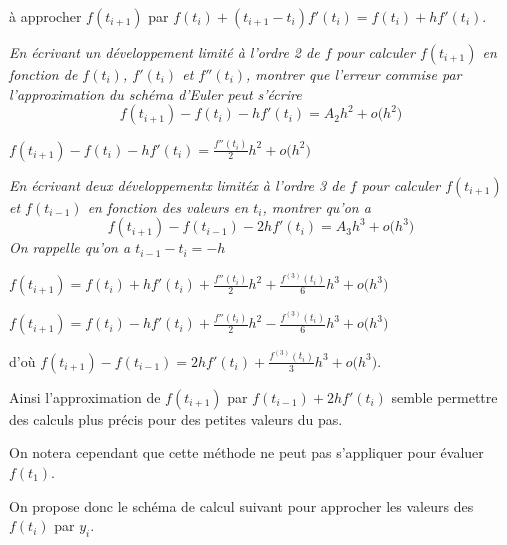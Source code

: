  à approcher $f(t_{i+1})$ par $f(t_i) + (t_{i+1} - t_i)f'(t_i) = f(t_i) + hf'(t_i)$.
\begin{Exercise}[title = {Des maths simples}]\it
En écrivant un développement limité à l'ordre 2 de $f$ pour calculer $f(t_{i+1})$ en fonction de $f(t_i)$, $f'(t_i)$ et $f''(t_i)$, montrer que l'erreur commise par l'approximation du schéma d'Euler peut s'écrire
\[f(t_{i+1})- f(t_i) - hf'(t_i) = A_2h^2 + o\bigl(h^2\bigr)\]
\end{Exercise}
\begin{Answer}
$f(t_{i+1})- f(t_i) - hf'(t_i) = \frac{f''(t_i)}2h^2 + o\bigl(h^2\bigr)$
\end{Answer}
\begin{Exercise}[title = {Un peu de calcul mathématique}]\it
En écrivant deux développementx limitéx à l'ordre 3 de $f$ pour calculer $f(t_{i+1})$ et $f(t_{i-1})$ en fonction des valeurs en $t_i$, montrer qu'on a
\[f(t_{i+1})- f(t_{i-1}) - 2hf'(t_i) = A_3h^3 + o\bigl(h^3\bigr)\]
On rappelle qu'on a $t_{i-1} - t_i = -h$
\end{Exercise}
\begin{Answer}
$f(t_{i+1})= f(t_i) + hf'(t_i) + \frac{f''(t_i)}2h^2 + \frac{f^{(3)}(t_i)}6h^3 + o\bigl(h^3\bigr)$

$f(t_{i+1})= f(t_i) - hf'(t_i) + \frac{f''(t_i)}2h^2 - \frac{f^{(3)}(t_i)}6h^3 + o\bigl(h^3\bigr)$

d'où $f(t_{i+1})- f(t_{i-1}) = 2hf'(t_i) + \frac{f^{(3)}(t_i)}3h^3 + o\bigl(h^3\bigr)$.
\end{Answer}
\bigskip

Ainsi l'approximation de $f(t_{i+1})$ par $f(t_{i-1}) + 2hf'(t_i)$ semble permettre des calculs plus précis pour des petites valeurs du pas. 

On notera cependant que cette méthode ne peut pas s'appliquer pour évaluer $f(t_1)$.

On propose donc le schéma de calcul suivant pour approcher les valeurs des $f(t_i)$ par $y_i$.

